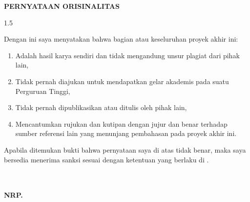 \thispagestyle{fancy}

\begin{center}
  {\fontsize{20}{10}\bfseries PERNYATAAN ORISINALITAS\par}
\end{center}
\vspace{1.5cm}

{\fontsize{12}{15}\selectfont
  \begin{spacing}{1.5}

    \noindent Dengan ini saya menyatakan bahwa bagian atau keseluruhan proyek akhir ini:

    \begin{enumerate}[label=\arabic*., leftmargin=*]
      \item Adalah hasil karya sendiri dan tidak mengandung unsur plagiat dari pihak lain,
      \item Tidak pernah diajukan untuk mendapatkan gelar akademis pada suatu Perguruan Tinggi,
      \item Tidak pernah dipublikasikan atau ditulis oleh pihak lain,
      \item Mencantumkan rujukan dan kutipan dengan jujur dan benar terhadap sumber referensi
        lain yang menunjang pembahasan pada proyek akhir ini.
    \end{enumerate}

    Apabila ditemukan bukti bahwa pernyataan saya di atas tidak benar, maka saya bersedia
    menerima sanksi sesuai dengan ketentuan yang berlaku di \NamaInstitusi.

  \end{spacing}

  \vspace{2.5cm}

  \hfill
  \begin{minipage}{6.5cm}
    \TanggalSidang\\[2cm]
    \underline{\bfseries \NamaMahasiswa}\\
    \bfseries NRP. \NRP
  \end{minipage}
}
